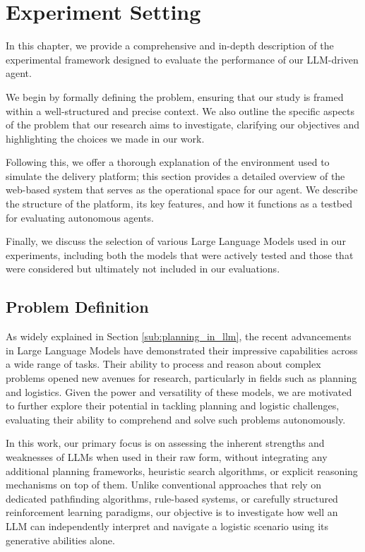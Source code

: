 \chapter{Experiment Setting}
\label{cha:experiment_setting}

In this chapter, we provide a comprehensive and in-depth description of the experimental
framework designed to evaluate the performance of our LLM-driven agent.

We begin by formally defining the problem, ensuring that our study is framed
within a well-structured and precise context. We also outline the specific aspects
of the problem that our research aims to investigate, clarifying our objectives
and highlighting the choices we made in our work.

Following this, we offer a thorough explanation of the environment used to simulate
the delivery platform; this section provides a detailed overview of the web-based
system that serves as the operational space for our agent. We describe the structure
of the platform, its key features, and how it functions as a testbed for evaluating
autonomous agents.

Finally, we discuss the selection of various Large Language Models used in our
experiments, including both the models that were actively tested and those that were
considered but ultimately not included in our evaluations.

\section{Problem Definition}
\label{sec:problem_definition}

As widely explained in Section \ref{sub:planning_in_llm}, the recent advancements
in Large Language Models have demonstrated their impressive capabilities across a
wide range of tasks. Their ability to process and reason about complex problems
opened new avenues for research, particularly in fields such as planning and logistics.
Given the power and versatility of these models, we are motivated to further explore
their potential in tackling planning and logistic challenges, evaluating their
ability to comprehend and solve such problems autonomously.

In this work, our primary focus is on assessing the inherent strengths and weaknesses
of LLMs when used in their raw form, without integrating any additional planning
frameworks, heuristic search algorithms, or explicit reasoning mechanisms on top
of them. Unlike conventional approaches that rely on dedicated pathfinding algorithms,
rule-based systems, or carefully structured reinforcement learning paradigms,
our objective is to investigate how well an LLM can independently interpret and
navigate a logistic scenario using its generative abilities alone.

